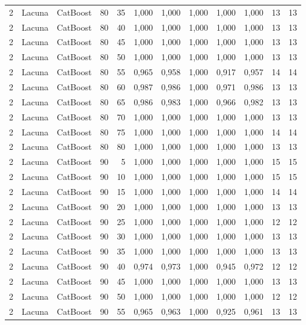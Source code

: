 \begin{longtable}{@{}rllrrrrrrrrr@{}}
2 & Lacuna & CatBoost & 80 & 35 & 1,000 & 1,000 & 1,000 & 1,000 & 1,000 & 13 & 13 \\
2 & Lacuna & CatBoost & 80 & 40 & 1,000 & 1,000 & 1,000 & 1,000 & 1,000 & 13 & 13 \\
2 & Lacuna & CatBoost & 80 & 45 & 1,000 & 1,000 & 1,000 & 1,000 & 1,000 & 13 & 13 \\
2 & Lacuna & CatBoost & 80 & 50 & 1,000 & 1,000 & 1,000 & 1,000 & 1,000 & 13 & 13 \\
2 & Lacuna & CatBoost & 80 & 55 & 0,965 & 0,958 & 1,000 & 0,917 & 0,957 & 14 & 14 \\
2 & Lacuna & CatBoost & 80 & 60 & 0,987 & 0,986 & 1,000 & 0,971 & 0,986 & 13 & 13 \\
2 & Lacuna & CatBoost & 80 & 65 & 0,986 & 0,983 & 1,000 & 0,966 & 0,982 & 13 & 13 \\
2 & Lacuna & CatBoost & 80 & 70 & 1,000 & 1,000 & 1,000 & 1,000 & 1,000 & 13 & 13 \\
2 & Lacuna & CatBoost & 80 & 75 & 1,000 & 1,000 & 1,000 & 1,000 & 1,000 & 14 & 14 \\
2 & Lacuna & CatBoost & 80 & 80 & 1,000 & 1,000 & 1,000 & 1,000 & 1,000 & 13 & 13 \\
2 & Lacuna & CatBoost & 90 & 5 & 1,000 & 1,000 & 1,000 & 1,000 & 1,000 & 15 & 15 \\
2 & Lacuna & CatBoost & 90 & 10 & 1,000 & 1,000 & 1,000 & 1,000 & 1,000 & 15 & 15 \\
2 & Lacuna & CatBoost & 90 & 15 & 1,000 & 1,000 & 1,000 & 1,000 & 1,000 & 14 & 14 \\
2 & Lacuna & CatBoost & 90 & 20 & 1,000 & 1,000 & 1,000 & 1,000 & 1,000 & 13 & 13 \\
2 & Lacuna & CatBoost & 90 & 25 & 1,000 & 1,000 & 1,000 & 1,000 & 1,000 & 12 & 12 \\
2 & Lacuna & CatBoost & 90 & 30 & 1,000 & 1,000 & 1,000 & 1,000 & 1,000 & 13 & 13 \\
2 & Lacuna & CatBoost & 90 & 35 & 1,000 & 1,000 & 1,000 & 1,000 & 1,000 & 13 & 13 \\
2 & Lacuna & CatBoost & 90 & 40 & 0,974 & 0,973 & 1,000 & 0,945 & 0,972 & 12 & 12 \\
2 & Lacuna & CatBoost & 90 & 45 & 1,000 & 1,000 & 1,000 & 1,000 & 1,000 & 13 & 13 \\
2 & Lacuna & CatBoost & 90 & 50 & 1,000 & 1,000 & 1,000 & 1,000 & 1,000 & 12 & 12 \\
2 & Lacuna & CatBoost & 90 & 55 & 0,965 & 0,963 & 1,000 & 0,925 & 0,961 & 13 & 13 \\

\end{longtable}
